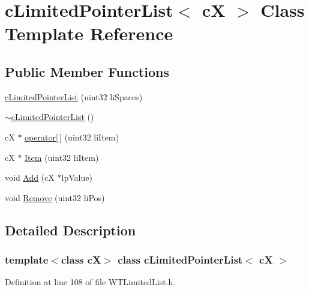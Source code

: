 \hypertarget{classc_limited_pointer_list}{
\section{cLimitedPointerList$<$ cX $>$ Class Template Reference}
\label{classc_limited_pointer_list}
}
\subsection*{Public Member Functions}
\begin{DoxyCompactItemize}
\item 
\hyperlink{classc_limited_pointer_list_a07bb790fa0cce46a4724f87445278a2a}{cLimitedPointerList} (uint32 liSpaces)
\item 
\hyperlink{classc_limited_pointer_list_a4aef178a850d901cefc169cd0f8b1e71}{$\sim$cLimitedPointerList} ()
\item 
cX $\ast$ \hyperlink{classc_limited_pointer_list_a118f2d5687c97cf122b163dbbdedb56d}{operator\mbox{[}$\,$\mbox{]}} (uint32 liItem)
\item 
cX $\ast$ \hyperlink{classc_limited_pointer_list_a00af27280f0a9d3f89fa8b9da36b7554}{Item} (uint32 liItem)
\item 
void \hyperlink{classc_limited_pointer_list_a0ba95ea83cbfee5957645c711ccab08c}{Add} (cX $\ast$lpValue)
\item 
void \hyperlink{classc_limited_pointer_list_a61fdd759615a826b5f385ad0b9ddfb0d}{Remove} (uint32 liPos)
\end{DoxyCompactItemize}


\subsection{Detailed Description}
\subsubsection*{template$<$class cX$>$ class cLimitedPointerList$<$ cX $>$}



Definition at line 108 of file WTLimitedList.h.



